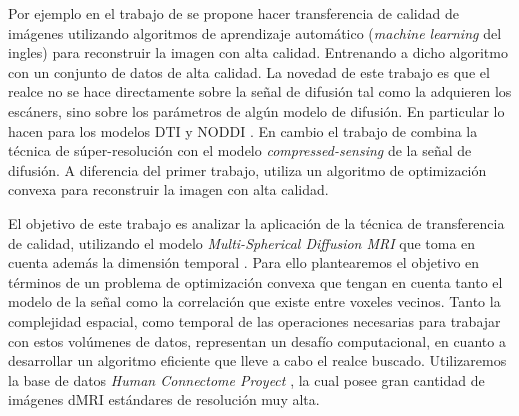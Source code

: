 \documentclass[a4paper,10pt]{article}
\begin{document}
Por ejemplo en el trabajo de \citet{Alexander2014} se propone hacer transferencia de 
calidad de imágenes utilizando algoritmos de aprendizaje automático 
(\textit{machine learning} del ingles) para reconstruir la imagen con alta 
calidad. Entrenando a dicho algoritmo con un conjunto de datos de alta 
calidad. La novedad de este trabajo es que el realce no se hace directamente 
sobre la señal de difusión tal como la adquieren los escáners, sino sobre los 
parámetros de algún modelo de difusión. En particular lo hacen para los modelos DTI y NODDI 
\citep{Zhang2012}. 
En cambio el trabajo de \citet{Ning2016} combina la 
t\'ecnica de súper-resolución con el modelo \textit{compressed-sensing} \citep{Naidoo2015} de la señal de difusión. A 
diferencia del primer trabajo, utiliza un algoritmo de 
optimización convexa para reconstruir la imagen con alta calidad.

El objetivo de este trabajo es analizar la aplicación de la técnica de 
transferencia de calidad, utilizando el modelo \textit{Multi-Spherical Diffusion MRI} que toma en cuenta además 
la dimensión temporal \citep{Fick}. Para ello plantearemos el objetivo en términos de un problema 
de optimización convexa que tengan en cuenta tanto el modelo de la se\~nal como la correlaci\'on 
que existe entre voxeles vecinos. Tanto la complejidad espacial, como temporal de las 
operaciones necesarias para trabajar con estos vol\'umenes de datos, representan un desafío 
computacional, en cuanto a desarrollar un algoritmo eficiente que lleve a cabo el realce buscado. 
Utilizaremos la base de datos \textit{Human Connectome Proyect} \citep{Barch2013}, la cual posee 
gran cantidad de imágenes dMRI estándares de resolución muy alta.



\clearpage


\end{document}
